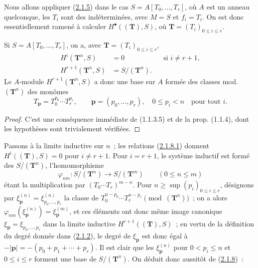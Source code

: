 \begin{env}[2.1.7]
\label{III.2.1.7-fr}
Nous allons appliquer (\hyperref[III.2.1.5-fr]{2.1.5}) dans le cas
$S=A[T_0,\ldots,T_r]$, où $A$ est un anneau quelconque, les $T_i$ sont des
indéterminées, avec $M=S$ et $f_i=T_i$. On est donc essentiellement ramené
à calculer $H^\bullet((\mathbf T),S)$, où
$\mathbf T=(T_i)_{0\leq i\leq r}$.
\end{env}

\begin{lemma}[2.1.8]
\label{III.2.1.8-fr}
Si $S=A[T_0,\ldots,T_r]$, on a, avec
$\mathbf T=(T_i)_{0\leq i\leq r}$,
\begin{align}
\label{III.2.1.8.1-fr}
\tag{2.1.8.1}
H^i(\mathbf T^n,S)&=0 &&\text{si }i\neq r+1,\\
\label{III.2.1.8.2-fr}
\tag{2.1.8.2}
H^{r+1}(\mathbf T^n,S)&=S/(\mathbf T^n).
\end{align}
Le $A$-module $H^{r+1}(\mathbf T^n,S)$ a donc une base sur $A$ formée des
classes mod. $(\mathbf T^n)$ des monômes
\[
T_{\mathbf p}=T_0^{p_0}\cdots T_r^{p_r},
\qquad \mathbf p=(p_0,\ldots,p_r),\quad 0\leq p_i<n
\quad\text{pour tout }i.
\]
\end{lemma}

\begin{proof}
C'est une conséquence immédiate de (1.1.3.5) et de la prop. (1.1.4), dont
les hypothèses sont trivialement vérifiées.
\end{proof}

\begin{env}[2.1.9]
\label{III.2.1.9-fr}
Passons à la limite inductive sur $n$~; les relations
(\hyperref[III.2.1.8.1-fr]{2.1.8.1}) donnent
$H^i((\mathbf T),S)=0$ pour $i\neq r+1$. Pour $i=r+1$, le système inductif
est formé des $S/(\mathbf T^n)$, l'homomorphisme
\[
\varphi_{nm}:S/(\mathbf T^n)\longrightarrow S/(\mathbf T^m)
\qquad(0\leq n\leq m)
\]
étant la multiplication par $(T_0\cdots T_r)^{m-n}$. Pour
$n\geq\sup(p_i)_{0\leq i\leq r}$, désignons par
$\xi_{\mathbf p}^{(n)}=\xi_{p_0,\ldots,p_r}^{(n)}$ la classe de
$T_0^{n-p_0}\cdots T_r^{n-p_r}\pmod{(\mathbf T^n)}$~; on a alors
$\varphi_{nm}(\xi_{\mathbf p}^{(n)})=\xi_{\mathbf p}^{(m)}$, et ces éléments
ont donc même image canonique
$\xi_{\mathbf p}=\xi_{p_0,\ldots,p_r}$ dans la limite inductive
$H^{r+1}((\mathbf T),S)$~; en vertu de la définition du degré donnée dans
(\hyperref[III.2.1.2-fr]{2.1.2}), le degré de $\xi_{\mathbf p}$ est donc
égal à $-|\mathbf p|=-(p_0+p_1+\cdots+p_r)$. Il est clair que les
$\xi_{\mathbf p}^{(n)}$ pour $0<p_i\leq n$ et $0\leq i\leq r$ forment une
base de $S/(\mathbf T^n)$. On déduit donc aussitôt de
(\hyperref[III.2.1.8-fr]{2.1.8})~:
\end{env}

